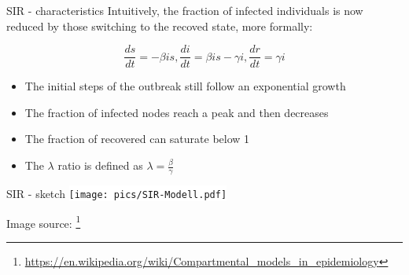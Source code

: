 \begin{textbox}{SIR - characteristics}
    Intuitively, the fraction of infected individuals is now reduced by those switching to the recoved state, more formally:

    \[
        \frac{ds}{dt}=-\beta i s ,
        \frac{di}{dt}=\beta i s- \gamma i,
        \frac{dr}{dt}= \gamma i
    \]

    \begin{itemize}
        \item The initial steps of the outbreak still follow an exponential growth
        \item The fraction of infected nodes reach a peak and then decreases
        \item The fraction of recovered can saturate below 1
        \item The $\lambda$ ratio is defined as $\lambda=\frac{\beta}{\gamma}$
    \end{itemize}

\end{textbox}


\begin{textbox}{SIR - sketch}
    \centering
    \colorbox{white}{\texttt{[image: pics/SIR-Modell.pdf]}}

    Image source: \footnote{\url{https://en.wikipedia.org/wiki/Compartmental_models_in_epidemiology}}
\end{textbox}






